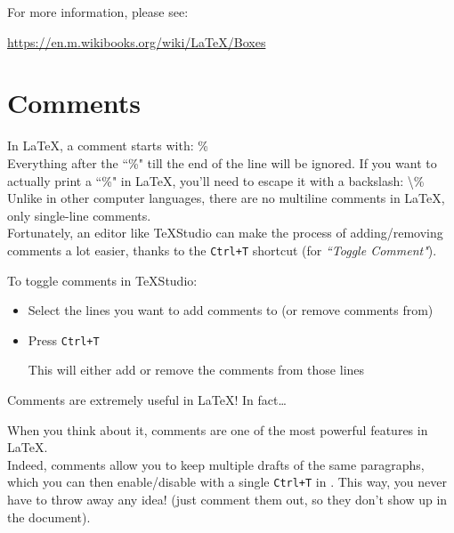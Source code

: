 \bigskip

For more information, please see:
\begin{center}
	\url{https://en.m.wikibooks.org/wiki/LaTeX/Boxes}
\end{center}

\bigskip



\section{Comments} \label{comments}


In \LaTeX, a comment starts with: \% \\


Everything after the ``\%" till the end of the line will be ignored. If you want to actually print a ``\%" in \LaTeX, you'll need to escape it with a backslash: \textbackslash \% \\

Unlike in other computer languages, there are no multiline comments in \LaTeX, only single-line comments.
\\


Fortunately, an editor like TeXStudio can make the process of adding/removing comments a lot easier, thanks to the \texttt{Ctrl+T} shortcut (for \emph{``Toggle Comment"}).

\begin{mdframed}
\medskip
	To toggle comments in TeXStudio:
	\begin{itemize}
		\item Select the lines you want to add comments to (or remove comments from)
		\item Press \texttt{Ctrl+T}
		
		This will either add or remove the comments from those lines
	\end{itemize}
\medskip
\end{mdframed}



Comments are extremely useful in \LaTeX! In fact\dots 

\begin{note}
When you think about it, comments are one of the most powerful features in \LaTeX. \\

Indeed, comments allow you to keep multiple drafts of the same paragraphs, which you can then enable/disable with a single \texttt{Ctrl+T} in \TeXstudio. This way, you never have to throw away any idea! (just comment them out, so they don't show up in the document).
\end{note}



